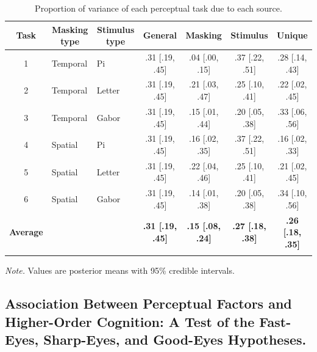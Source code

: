 \documentclass[
  ,man]{apa6}
\begin{document}
\begin{table}[tbp]

\begin{center}
\begin{threeparttable}

\caption{\label{tab:tab-shares}Proportion of variance of each perceptual task due to each source.}

\small{

\begin{tabular}{cllcccc}
\toprule
Task & \multicolumn{1}{c}{Masking type} & \multicolumn{1}{c}{Stimulus type} & \multicolumn{1}{c}{General} & \multicolumn{1}{c}{Masking} & \multicolumn{1}{c}{Stimulus} & \multicolumn{1}{c}{Unique}\\
\midrule
1 & Temporal & Pi & .31 [.19, .45] & .04 [.00, .15] & .37 [.22, .51] & .28 [.14, .43]\\
2 & Temporal & Letter & .31 [.19, .45] & .21 [.03, .47] & .25 [.10, .41] & .22 [.02, .45]\\
3 & Temporal & Gabor & .31 [.19, .45] & .15 [.01, .44] & .20 [.05, .38] & .33 [.06, .56]\\
4 & Spatial & Pi & .31 [.19, .45] & .16 [.02, .35] & .37 [.22, .51] & .16 [.02, .33]\\
5 & Spatial & Letter & .31 [.19, .45] & .22 [.04, .46] & .25 [.10, .41] & .21 [.02, .45]\\
6 & Spatial & Gabor & .31 [.19, .45] & .14 [.01, .38] & .20 [.05, .38] & .34 [.10, .56]\\
\textbf{Average} &  &  & \textbf{.31 [.19, .45]} & \textbf{.15 [.08, .24]} & \textbf{.27 [.18, .38]} & \textbf{.26 [.18, .35]}\\
\bottomrule
\addlinespace
\end{tabular}

}

\begin{tablenotes}[para]
\normalsize{\textit{Note.} Values are posterior means with 95\% credible intervals.}
\end{tablenotes}

\end{threeparttable}
\end{center}

\end{table}

\subsection{Association Between Perceptual Factors and Higher-Order Cognition: A Test of the Fast-Eyes, Sharp-Eyes, and Good-Eyes Hypotheses.}\label{association-between-perceptual-factors-and-higher-order-cognition-a-test-of-the-fast-eyes-sharp-eyes-and-good-eyes-hypotheses.}
\end{document}
